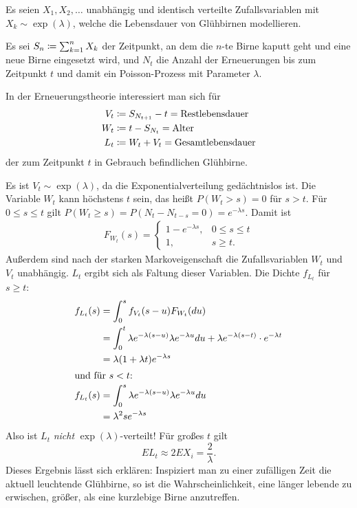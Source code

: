 \documentclass[a4paper,twoside,DIV15,BCOR12mm]{scrbook}
\begin{document}
\begin{beispiel}
Es seien $X_1,X_2,\ldots$ unabhängig und identisch verteilte Zufallsvariablen mit $X_k\sim \exp(\lambda)$, welche die Lebensdauer von Glühbirnen modellieren.

Es sei $S_n \da \sum_{k=1}^n X_k$ der Zeitpunkt, an dem die $n$-te Birne kaputt geht und eine neue Birne eingesetzt wird, und $N_t$ die Anzahl der Erneuerungen bis zum Zeitpunkt $t$ und damit ein Poisson-Prozess mit Parameter $\lambda$.

In der Erneuerungstheorie interessiert man sich für 
\begin{align*}
V_t &\da S_{N_{t+1}}-t = \text{Restlebensdauer} \\
W_t &\da t- S_{N_t} = \text{Alter} \\
L_t &\da  W_t + V_t = \text{Gesamtlebensdauer}
\end{align*}
der zum Zeitpunkt $t$ in Gebrauch befindlichen Glühbirne.

Es ist $V_t \sim \exp(\lambda)$, da die Exponentialverteilung gedächtnislos ist. Die Variable $W_t$ kann höchstens $t$ sein, das heißt $P(W_t > s) = 0$ für $s>t$. Für $0\le s \le t$ gilt $P(W_t \ge s) = P(N_t-N_{t-s} = 0) = e^{-\lambda s}$. Damit ist
\begin{align*}
F_{W_t}(s) = 
\begin{cases}
1-e^{-\lambda s},& 0\le s \le t \\
1, & s\ge t.
\end{cases}
\end{align*}
Außerdem sind nach der starken Markoveigenschaft die Zufallsvariablen $W_t$ und $V_t$ unabhängig. $L_t$ ergibt sich als Faltung dieser Variablen. Die Dichte $f_{L_t}$ für $s\ge t$:
\begin{align*}
f_{L_t}(s) &= \int_0^s f_{V_t}(s-u)F_{W_t}(du) \\
&= \int_0^t \lambda e^{-\lambda(s-u)}\lambda e^{-\lambda u} du + \lambda e^{-\lambda(s-t)}\cdot e^{-\lambda t} \\
&= \lambda (1+\lambda t)e^{-\lambda s}\\
\intertext{und für $s < t$:}
f_{L_t}(s) &= \int_0^s \lambda e^{-\lambda(s-u)}\lambda e^{-\lambda u}du \\
&= \lambda ^2 s e^{-\lambda s}
\end{align*}
Also ist $L_t$ \emph{nicht} $\exp(\lambda)$-verteilt! Für großes $t$ gilt
\[
EL_{t} \approx 2 EX_i=\frac 2 {\lambda}.
\]
Dieses Ergebnis lässt sich erklären: Inspiziert man zu einer zufälligen Zeit die aktuell leuchtende Glühbirne, so ist die Wahrscheinlichkeit, eine länger lebende zu erwischen, größer, als eine kurzlebige Birne anzutreffen.
\end{beispiel}
\end{document}
